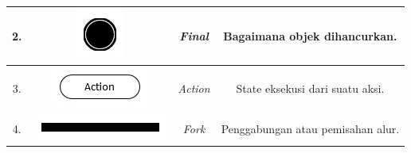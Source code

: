 \begin{table}[htbp]
\begin{center}
\begin{tabular}{|c|c|c|c| }
            2. & \begin{minipage}{.1\textwidth}
                \includegraphics[width=\linewidth]{bab2/gambar/uml/final.jpg}
            \end{minipage} & \textit{Final}   & Bagaimana  objek dihancurkan.             \\ \hline

            3. & \begin{minipage}{.2\textwidth}
                \includegraphics[width=\linewidth]{bab2/gambar/uml/action.jpg}
            \end{minipage} & \textit{Action}  & State eksekusi dari suatu aksi.           \\ \hline

            4. & \begin{minipage}{.2\textwidth}
                \includegraphics[width=\linewidth]{bab2/gambar/uml/fork.jpg}
            \end{minipage} & \textit{Fork}    & Penggabungan atau pemisahan alur.            \\ \hline


\end{tabular}
\end{center}
\end{table}

